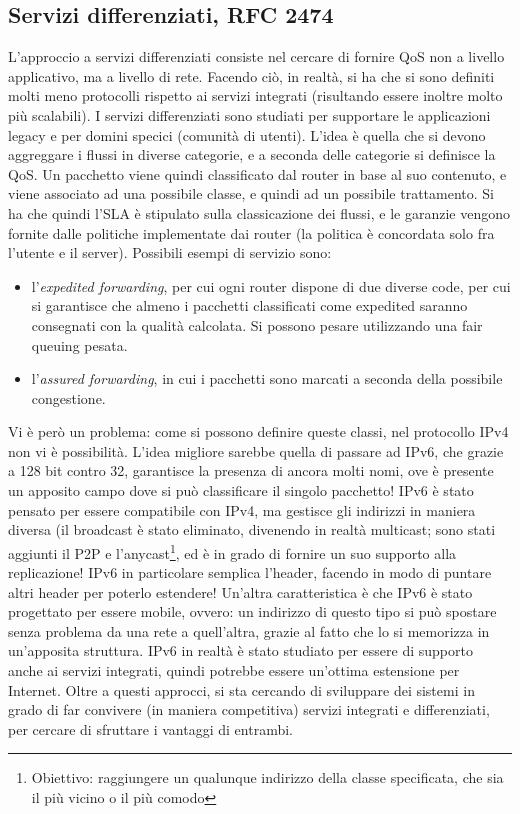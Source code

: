 \subsection{Servizi differenziati, RFC 2474}
L'approccio a servizi differenziati consiste nel cercare di fornire QoS non a livello applicativo, ma a livello di 
rete. Facendo ciò, in realtà, si ha che si sono definiti molti meno protocolli rispetto ai servizi integrati 
(risultando essere inoltre molto più scalabili). I servizi differenziati sono studiati per supportare le applicazioni
legacy e per domini specici (comunità di utenti). L'idea è quella che si devono aggreggare i flussi in diverse
categorie, e a seconda delle categorie si definisce la QoS. Un pacchetto viene quindi classificato dal router in base al
suo contenuto, e viene associato ad una possibile classe, e quindi ad un possibile trattamento.
Si ha che quindi l'SLA è stipulato sulla classicazione dei flussi, e le garanzie vengono fornite dalle politiche
implementate dai router (la politica è concordata solo fra l'utente e il server).
Possibili esempi di servizio sono:
\begin{itemize}
 \item l'\textit{expedited forwarding}, per cui ogni router dispone di due diverse code, per cui si garantisce che
 almeno i pacchetti classificati come expedited saranno consegnati con la qualità calcolata. Si possono pesare
 utilizzando una fair queuing pesata.
 \item l'\textit{assured forwarding}, in cui i pacchetti sono marcati a seconda della possibile congestione.
\end{itemize}
Vi è però un problema: come si possono definire queste classi, nel protocollo IPv4 non vi è possibilità. L'idea 
migliore sarebbe quella di passare ad IPv6, che grazie a 128 bit contro 32, garantisce la presenza di ancora molti 
nomi, ove è presente un apposito campo dove si può classificare il singolo pacchetto!
IPv6 è stato pensato per essere compatibile con IPv4, ma gestisce gli indirizzi in maniera diversa (il broadcast è 
stato eliminato, divenendo in realtà multicast; sono stati aggiunti il P2P e l'anycast\footnote{Obiettivo: raggiungere
un qualunque indirizzo della classe specificata, che sia il più vicino o il più comodo}, ed è in grado di fornire un
suo supporto alla replicazione! IPv6 in particolare semplica l'header, facendo in modo di puntare altri header per
poterlo estendere! Un'altra caratteristica è che IPv6 è stato progettato per essere mobile, ovvero: un indirizzo di
questo tipo si può spostare senza problema da una rete a quell'altra, grazie al fatto che lo si memorizza in 
un'apposita struttura. IPv6 in realtà è stato studiato per essere di supporto anche ai servizi integrati, quindi
potrebbe essere un'ottima estensione per Internet.
Oltre a questi approcci, si sta cercando di sviluppare dei sistemi in grado di far convivere (in maniera competitiva)
servizi integrati e differenziati, per cercare di sfruttare i vantaggi di entrambi.